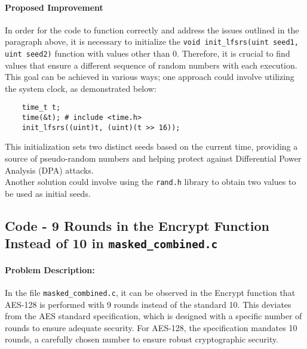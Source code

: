 \documentclass[12pt]{article}
\begin{document}
    \paragraph{Proposed Improvement}
    In order for the code to function correctly and address the issues outlined in the paragraph above, it is necessary to initialize the \texttt{void init\_lfsrs(uint seed1, uint seed2)} function with values other than 0. Therefore, it is crucial to find values that ensure a different sequence of random numbers with each execution.
    \\
    This goal can be achieved in various ways; one approach could involve utilizing the system clock, as demonstrated below:
    \begin{verbatim}
    time_t t;
    time(&t); # include <time.h>
    init_lfsrs((uint)t, (uint)(t >> 16));
    \end{verbatim}
    This initialization sets two distinct seeds based on the current time, providing a source of pseudo-random numbers and helping protect against Differential Power Analysis (DPA) attacks.
    \\
    Another solution could involve using the \texttt{rand.h} library to obtain two values to be used as initial seeds.
    
\subsection{Code - 9 Rounds in the Encrypt Function Instead of 10 in \texttt{masked\_combined.c}}

    \paragraph{Problem Description:}
    In the file \texttt{masked\_combined.c}, it can be observed in the Encrypt function that AES-128 is performed with 9 rounds instead of the standard 10. This deviates from the AES standard specification, which is designed with a specific number of rounds to ensure adequate security. For AES-128, the specification mandates 10 rounds, a carefully chosen number to ensure robust cryptographic security.
    
\end{document}
